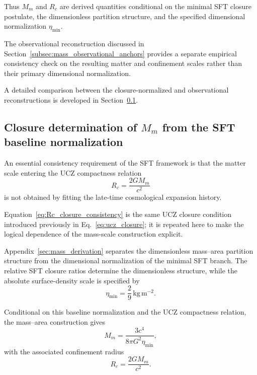 \documentclass[12pt]{article}
\begin{document}
Thus $M_m$ and $R_c$ are derived quantities conditional on the
minimal SFT closure postulate, the dimensionless partition structure,
and the specified dimensional normalization $\eta_{\min}$.

The observational reconstruction discussed in
Section~\ref{subsec:mass_observational_anchors} provides a separate
empirical consistency check on the resulting matter and confinement
scales rather than their primary dimensional normalization.

A detailed comparison between the closure-normalized and observational
reconstructions is developed in
Section~\ref{subsec:independent_geometric_determination}.


\subsection{Closure determination of $M_m$ from the SFT baseline normalization}
\label{subsec:independent_geometric_determination}

An essential consistency requirement of the SFT framework is that the
matter scale entering the UCZ compactness relation
\begin{equation}
\boxed{
R_c
=
\frac{2GM_m}{c^2}
}
\label{eq:Rc_closure_consistency}
\end{equation}
is not obtained by fitting the late-time cosmological expansion history.

Equation~\eqref{eq:Rc_closure_consistency} is the same UCZ closure
condition introduced previously in
Eq.~\eqref{eq:ucz_closure}; it is repeated here to make the
logical dependence of the mass-scale construction explicit.

Appendix~\ref{sec:mass_derivation} separates the dimensionless
mass--area partition structure from the dimensional normalization of
the minimal SFT branch. The relative SFT closure ratios determine the
dimensionless structure, while the absolute surface-density scale is
specified by
\begin{equation}
\eta_{\min}
=
\frac{2}{9}\,\mathrm{kg\,m^{-2}}.
\label{eq:eta_min_closure_determination}
\end{equation}

Conditional on this baseline normalization and the UCZ compactness
relation, the mass--area construction gives
\begin{equation}
\boxed{
M_m
=
\frac{3c^4}{8\pi G^2\eta_{\min}},
}
\label{eq:Mm_eta}
\end{equation}
with the associated confinement radius
\begin{equation}
\boxed{
R_c
=
\frac{2GM_m}{c^2}.
}
\label{eq:Rc_from_Mm_eta}
\end{equation}
\end{document}

